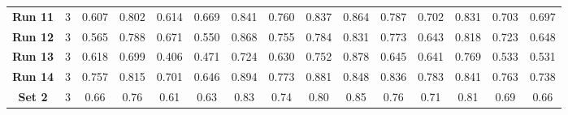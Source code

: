 \begin{table*}[!ht]
{\begin{tabular}{|c|c|ccc|ccc|ccc|c|c|c|c|}
			\textbf{Run 11} & 3 & \multicolumn{1}{c|}{0.607} & \multicolumn{1}{c|}{0.802} & 0.614 & \multicolumn{1}{c|}{0.669} & \multicolumn{1}{c|}{0.841} & 0.760 & \multicolumn{1}{c|}{0.837} & \multicolumn{1}{c|}{0.864} & 0.787 & 0.702 & 0.831 & 0.703 & 0.697 \\
			
			\textbf{Run 12} & 3 & \multicolumn{1}{c|}{0.565} & \multicolumn{1}{c|}{0.788} & 0.671 & \multicolumn{1}{c|}{0.550} & \multicolumn{1}{c|}{0.868} & 0.755 & \multicolumn{1}{c|}{0.784} & \multicolumn{1}{c|}{0.831} & 0.773 & 0.643 & 0.818 & 0.723 & 0.648 \\
			
			\textbf{Run 13} & 3 & \multicolumn{1}{c|}{0.618} & \multicolumn{1}{c|}{0.699} & 0.406 & \multicolumn{1}{c|}{0.471} & \multicolumn{1}{c|}{0.724} & 0.630 & \multicolumn{1}{c|}{0.752} & \multicolumn{1}{c|}{0.878} & 0.645 & 0.641 & 0.769 & 0.533 & 0.531 \\
			
			\textbf{Run 14} & 3 & \multicolumn{1}{c|}{0.757} & \multicolumn{1}{c|}{0.815} & 0.701 & \multicolumn{1}{c|}{0.646} & \multicolumn{1}{c|}{0.894} & 0.773 & \multicolumn{1}{c|}{0.881} & \multicolumn{1}{c|}{0.848} & 0.836 & 0.783 & 0.841 & 0.763 & 0.738 \\
			
			\hline
			
			\textbf{Set 2} & 3 & \multicolumn{1}{c|}{0.66} & \multicolumn{1}{c|}{0.76} & 0.61 & \multicolumn{1}{c|}{0.63} & \multicolumn{1}{c|}{0.83} & 0.74 & \multicolumn{1}{c|}{0.80} & \multicolumn{1}{c|}{0.85} & 0.76 & 0.71 & 0.81 & 0.69 & 0.66 \\
			
			\hline
			
	\end{tabular}}
	\label{tab:SegmentationUNetVariability}
\end{table*}